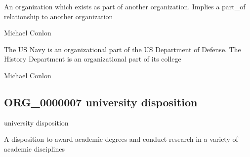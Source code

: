 \documentclass[letterpaper,10pt,english]{sphinxmanual}
\begin{document}
\begin{sphinxShadowBox}

\sphinxAtStartPar
An organization which exists as part of another organization.  Implies a part\_of relationship to another organization
\end{sphinxShadowBox}

\begin{sphinxShadowBox}

\sphinxAtStartPar
Michael Conlon 
\end{sphinxShadowBox}

\begin{sphinxShadowBox}

\sphinxAtStartPar
The US Navy is an organizational part of the US Department of Defense.  The History Department is an organizational part of its college
\end{sphinxShadowBox}

\begin{sphinxShadowBox}

\sphinxAtStartPar
Michael Conlon 
\end{sphinxShadowBox}
\begin{quote}

\ignorespaces \end{quote}


\subsection{ORG\_0000007 \sphinxhyphen{} university disposition}
\label{\detokenize{doc-ORG_0000007:org-0000007-university-disposition}}\label{\detokenize{doc-ORG_0000007:index-0}}\label{\detokenize{doc-ORG_0000007::doc}}
\begin{sphinxShadowBox}

\sphinxAtStartPar
university disposition
\end{sphinxShadowBox}

\begin{sphinxShadowBox}

\sphinxAtStartPar
A disposition to award academic degrees and conduct research in a variety of academic disciplines
\end{sphinxShadowBox}
\end{document}
